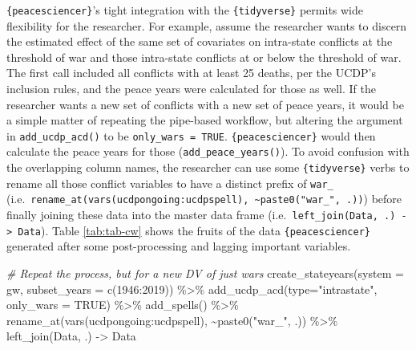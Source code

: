\documentclass[
  11pt,
]{article}
\newenvironment{Shaded}{\begin{snugshade}}{\end{snugshade}}
\newcommand{\AttributeTok}[1]{\textcolor[rgb]{0.77,0.63,0.00}{#1}}
\newcommand{\CommentTok}[1]{\textcolor[rgb]{0.56,0.35,0.01}{\textit{#1}}}
\newcommand{\ConstantTok}[1]{\textcolor[rgb]{0.00,0.00,0.00}{#1}}
\newcommand{\DecValTok}[1]{\textcolor[rgb]{0.00,0.00,0.81}{#1}}
\newcommand{\FunctionTok}[1]{\textcolor[rgb]{0.00,0.00,0.00}{#1}}
\newcommand{\NormalTok}[1]{#1}
\newcommand{\OtherTok}[1]{\textcolor[rgb]{0.56,0.35,0.01}{#1}}
\newcommand{\SpecialCharTok}[1]{\textcolor[rgb]{0.00,0.00,0.00}{#1}}
\newcommand{\StringTok}[1]{\textcolor[rgb]{0.31,0.60,0.02}{#1}}
\begin{document}
\texttt{\{peacesciencer\}}'s tight integration with the \texttt{\{tidyverse\}} permits wide flexibility for the researcher. For example, assume the researcher wants to discern the estimated effect of the same set of covariates on intra-state conflicts at the threshold of war and those intra-state conflicts at or below the threshold of war. The first call included all conflicts with at least 25 deaths, per the UCDP's inclusion rules, and the peace years were calculated for those as well. If the researcher wants a new set of conflicts with a new set of peace years, it would be a simple matter of repeating the pipe-based workflow, but altering the argument in \texttt{add\_ucdp\_acd()} to be \texttt{only\_wars\ =\ TRUE}. \texttt{\{peacesciencer\}} would then calculate the peace years for those (\texttt{add\_peace\_years()}). To avoid confusion with the overlapping column names, the researcher can use some \texttt{\{tidyverse\}} verbs to rename all those conflict variables to have a distinct prefix of \texttt{war\_} (i.e.~\texttt{rename\_at(vars(ucdpongoing:ucdpspell),\ \textasciitilde{}paste0("war\_",\ .))}) before finally joining these data into the master data frame (i.e.~\texttt{left\_join(Data,\ .)\ -\textgreater{}\ Data}). Table \ref{tab:tab-cw} shows the fruits of the data \texttt{\{peacesciencer\}} generated after some post-processing and lagging important variables.

\begin{Shaded}
\begin{Highlighting}[]
\CommentTok{\# Repeat the process, but for a new DV of just wars}
\FunctionTok{create\_stateyears}\NormalTok{(}\AttributeTok{system =} \StringTok{\textquotesingle{}gw\textquotesingle{}}\NormalTok{, }\AttributeTok{subset\_years =} \FunctionTok{c}\NormalTok{(}\DecValTok{1946}\SpecialCharTok{:}\DecValTok{2019}\NormalTok{)) }\SpecialCharTok{\%\textgreater{}\%}
  \FunctionTok{add\_ucdp\_acd}\NormalTok{(}\AttributeTok{type=}\StringTok{"intrastate"}\NormalTok{, }\AttributeTok{only\_wars =} \ConstantTok{TRUE}\NormalTok{) }\SpecialCharTok{\%\textgreater{}\%}
  \FunctionTok{add\_spells}\NormalTok{() }\SpecialCharTok{\%\textgreater{}\%}
  \FunctionTok{rename\_at}\NormalTok{(}\FunctionTok{vars}\NormalTok{(ucdpongoing}\SpecialCharTok{:}\NormalTok{ucdpspell), }\SpecialCharTok{\textasciitilde{}}\FunctionTok{paste0}\NormalTok{(}\StringTok{"war\_"}\NormalTok{, .)) }\SpecialCharTok{\%\textgreater{}\%}
  \FunctionTok{left\_join}\NormalTok{(Data, .) }\OtherTok{{-}\textgreater{}}\NormalTok{ Data}
\end{Highlighting}
\end{Shaded}
\end{document}
